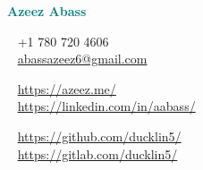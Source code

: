 \begin{minipage}[t]{1.0\textwidth}
    \begin{shaded*}
        \Huge
        \begin{minipage}[t]{\textwidth}
            \bfseries\FocusFont\textcolor{teal}{Azeez Abass}
            \raisebox{.3ex}{\Large$\cdot$ Software Engineer $\cdot$ Video Game and Web Developer}
        \end{minipage}
        \vspace{10pt}
        \footnotesize
        \begin{minipage}[t]{0.33\textwidth}
            \vspace{0pt} %
            \faPhone~ +1 780 720 4606 \\
            \faAt~ \url{abassazeez6@gmail.com} \\
        \end{minipage}
        \begin{minipage}[t]{0.33\textwidth}
            \vspace{0pt} %
            \faGlobe~ \url{https://azeez.me/} \\
            \faLinkedin~ \url{https://linkedin.com/in/aabass/} \\
        \end{minipage}
        \begin{minipage}[t]{0.33\textwidth}
            \vspace{0pt} %
            \faGithub~ \url{https://github.com/ducklin5/} \\
            \faGitlab~ \url{https://gitlab.com/ducklin5/} \\
        \end{minipage}
        \vspace{-2em}
    \end{shaded*}
\end{minipage}\\

